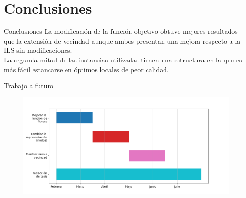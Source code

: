 \documentclass[11pt]{beamer}
\begin{document}
\section{Conclusiones}
\begin{frame}{Conclusiones}
La modificación de la función objetivo obtuvo mejores resultados que la extensión de vecindad aunque ambos presentan una mejora respecto a la ILS sin modificaciones.\\
La segunda mitad de las instancias utilizadas tienen una estructura en la que es más fácil estancarse en óptimos locales de peor calidad.\\
\end{frame}

\begin{frame}{Trabajo a futuro}
\begin{figure}
\centering
\includegraphics[scale=.46]{plantesis.png}
\end{figure}
\end{frame}
\end{document}
